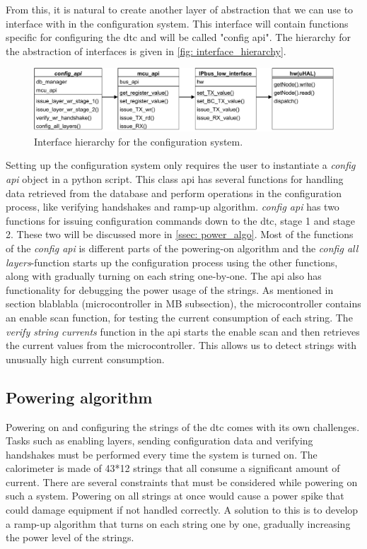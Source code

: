 \documentclass[main.tex]{subfiles}
\begin{document}
From this, it is natural to create another layer of abstraction that we can use to interface with in the configuration system. This interface will contain functions specific for configuring the \gls{dtc} and will be called "config api". The hierarchy for the abstraction of interfaces is given in \autoref{fig: interface_hierarchy}.



\begin{figure}[!ht]
    \centering
    \includegraphics[width=17cm, scale=4]{images/interface_hierarchy.pdf}
    \caption{Interface hierarchy for the configuration system.}
    \label{fig: interface_hierarchy}
\end{figure}
\FloatBarrier

Setting up the configuration system only requires the user to instantiate a \textit{config api} object in a python script. This class \gls{api} has several functions for handling data retrieved from the database and perform operations in the configuration process, like verifying handshakes and ramp-up algorithm. \textit{config api} has two functions for issuing configuration commands down to the \gls{dtc}, stage 1 and stage 2. These two will be discussed more in \autoref{ssec: power_algo}. Most of the functions of the \textit{config api} is different parts of the powering-on algorithm and the \textit{config all layers}-function starts up the configuration process using the other functions, along with gradually turning on each string one-by-one. The \gls{api} also has functionality for debugging the power usage of the strings. As mentioned in section blablabla (microcontroller in MB subsection), the microcontroller contains an enable scan function, for testing the current consumption of each string. The \textit{verify string currents} function in the \gls{api} starts the enable scan and then retrieves the current values from the microcontroller. This allows us to detect strings with unusually high current consumption.



\subsection{Powering algorithm}
\label{ssec: power_algo}
Powering on and configuring the strings of the \gls{dtc} comes with its own challenges. Tasks such as enabling layers, sending configuration data and verifying handshakes must be performed every time the system is turned on. The calorimeter is made of 43*12 strings that all consume a significant amount of current. There are several constraints that must be considered while powering on such a system. Powering on all strings at once would cause a power spike that could damage equipment if not handled correctly. A solution to this is to develop a ramp-up algorithm that turns on each string one by one, gradually increasing the power level of the strings. 
\end{document}
